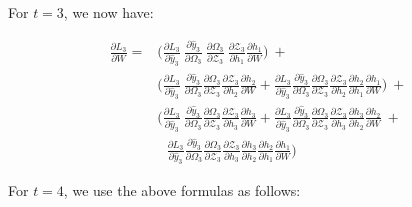 \documentclass{article}
\begin{document}
For $t=3$, we now have:

\begin{align*}
	\frac{\partial L_3}{ \partial{W}} = &\biggl(\frac{\partial L_3}{\partial \hat{y}_3}~\frac{\partial \hat{y}_3}{\partial \Omega_3}~\frac{\partial \Omega_3}{ \partial \mathcal{Z}_3} ~ \frac{\partial \mathcal{Z}_3}{ \partial h_1} \frac{\partial h_1}{ \partial W} \biggl) ~+~\\
	& \biggl(\frac{\partial L_3}{\partial \hat{y}_3}~\frac{\partial \hat{y}_3}{\partial \Omega_3}\frac{\partial \Omega_3}{ \partial \mathcal{Z}_3} \frac{\partial \mathcal{Z}_3}{ \partial h_2} \frac{\partial h_2}{ \partial W} + \frac{\partial L_3}{\partial \hat{y}_3}\frac{\partial \hat{y}_3}{\partial \Omega_3}\frac{\partial \Omega_3}{ \partial \mathcal{Z}_3} \frac{\partial \mathcal{Z}_3}{ \partial h_2} \frac{\partial h_2}{ \partial h_1}\frac{\partial h_1}{ \partial W}\biggl)~+~\\
	& \biggl(
	\frac{\partial L_3}{\partial \hat{y}_3}~\frac{\partial \hat{y}_3}{\partial \Omega_3}\frac{\partial \Omega_3}{ \partial \mathcal{Z}_3} \frac{\partial \mathcal{Z}_3}{ \partial h_3} \frac{\partial h_3}{ \partial W} + \frac{\partial L_3}{\partial \hat{y}_3}\frac{\partial \hat{y}_3}{\partial \Omega_3}\frac{\partial \Omega_3}{ \partial \mathcal{Z}_3} \frac{\partial \mathcal{Z}_3}{ \partial h_3} \frac{\partial h_3}{ \partial h_2}\frac{\partial h_2}{ \partial W}~+~\\
	&~~~\frac{\partial L_3}{\partial \hat{y}_3}\frac{\partial \hat{y}_3}{\partial \Omega_3}\frac{\partial \Omega_3}{ \partial \mathcal{Z}_3} \frac{\partial \mathcal{Z}_3}{ \partial h_3} \frac{\partial h_3}{ \partial h_2}\frac{\partial h_2}{ \partial h_1}\frac{\partial h_1}{ \partial W}
	\biggl)
\end{align*}

For $t=4$, we use the above formulas as follows:
\end{document}
